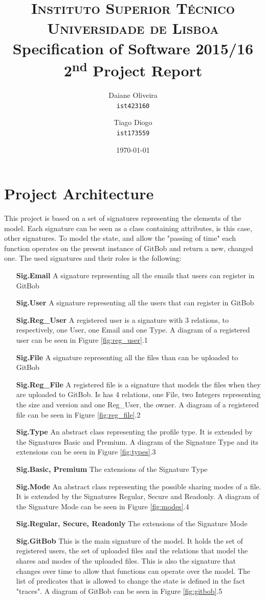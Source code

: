 \documentclass[paper=a4, fontsize=11pt]{scrartcl} %
\title{\vspace{-1.5cm}
\normalfont \normalsize 
\textsc{Instituto Superior Técnico\\Universidade de Lisboa} \\ [12pt] %
\huge Specification of Software 2015/16\\2\textsuperscript{nd} Project Report \\ [5pt]
}
\author{
  Daiane Oliveira\\
  \texttt{ist423160}
  \and
  Tiago Diogo\\
  \texttt{ist173559}
}
\date{\normalsize\today} %
\numberwithin{equation}{section} %
\numberwithin{figure}{section} %
\numberwithin{table}{section} %
\begin{document}
\maketitle %

\section{Project Architecture}
This project is based on a set of signatures representing the elements of the model. Each signature can be seen as a class containing attributes, is this case, other signatures. To model the state, and allow the "passing of time" each function operates on the present instance of GitBob and return a new, changed one. The used signatures and their roles is the following:

\begin{itemize}
	\item[\textbf{Sig.Email}] A signature representing all the emails that users can register in GitBob
	\item[\textbf{Sig.User}] A signature representing all the users that can register in GitBob
	\item[\textbf{Sig.Reg\_User}] A registered user is a signature with 3 relations, to respectively, one User, one Email and one Type. A diagram of a registered user can be seen in Figure \ref{fig:reg_user}.1
	\item[\textbf{Sig.File}] A signature representing all the files than can be uploaded to GitBob
	\item[\textbf{Sig.Reg\_File}] A registered file is a signature that models the files when they are uploaded to GitBob. Is has 4 relations, one File, two Integers representing the size and version and one Reg\_User, the owner. A diagram of a registered file can be seen in Figure \ref{fig:reg_file}.2 
	\item[\textbf{Sig.Type}] An abstract class representing the profile type. It is extended by the Signatures Basic and Premium. A diagram of the Signature Type and its extensions can be seen in Figure \ref{fig:types}.3
	\item[\textbf{Sig.Basic, Premium}] The extensions of the Signature Type
	\item[\textbf{Sig.Mode}] An abstract class representing the possible sharing modes of a file. It is extended by the Signatures Regular, Secure and Readonly. A diagram of the Signature Mode can be seen in Figure \ref{fig:modes}.4
	\item[\textbf{Sig.Regular, Secure, Readonly}] The extensions of the Signature Mode
	\item[\textbf{Sig.GitBob}] This is the main signature of the model. It holds the set of registered users, the set of uploaded files and the relations that model the shares and modes of the uploaded files. This is also the signature that changes over time to allow that functions can operate over the model. The list of predicates that is allowed to change the state is defined in the fact "traces". A diagram of GitBob can be seen in Figure \ref{fig:gitbob}.5
\end{itemize}
\end{document}
